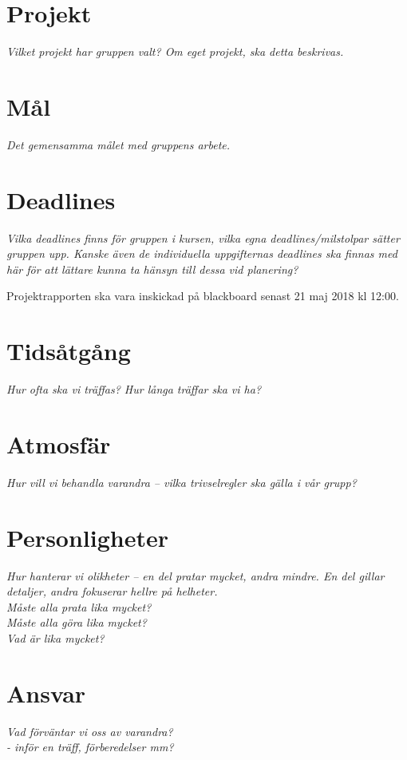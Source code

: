 
\section*{Projekt}
\textit{Vilket projekt har gruppen valt? Om eget projekt, ska detta beskrivas.}

\section*{Mål}
\textit{Det gemensamma målet med gruppens arbete.}

\section*{Deadlines}
\textit{Vilka deadlines finns för gruppen i kursen, vilka egna deadlines/milstolpar sätter gruppen upp. Kanske även de individuella uppgifternas deadlines ska finnas med här för att lättare kunna ta hänsyn till dessa vid planering?}

Projektrapporten ska vara inskickad på blackboard senast 21 maj 2018 kl 12:00.

\section*{Tidsåtgång}
\textit{Hur ofta ska vi träffas? Hur långa träffar ska vi ha?}

\section*{Atmosfär}
\textit{Hur vill vi behandla varandra – vilka trivselregler ska gälla i vår grupp?}

\section*{Personligheter}
\textit{Hur hanterar vi olikheter – en del pratar mycket, andra mindre. En del gillar detaljer, andra fokuserar hellre på helheter. \\
Måste alla prata lika mycket? \\
Måste alla göra lika mycket? \\
Vad är lika mycket?}

\section*{Ansvar}
\textit{Vad förväntar vi oss av varandra? \\
\indent - inför en träff, förberedelser mm?}


